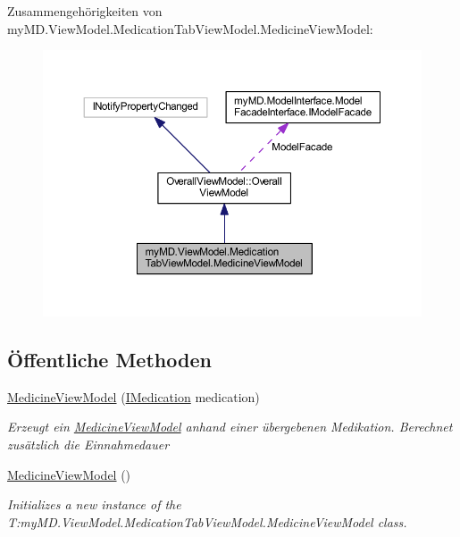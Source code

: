 Zusammengehörigkeiten von my\+M\+D.\+View\+Model.\+Medication\+Tab\+View\+Model.\+Medicine\+View\+Model\+:\nopagebreak
\begin{figure}[H]
\begin{center}
\leavevmode
\includegraphics[width=350pt]{classmy_m_d_1_1_view_model_1_1_medication_tab_view_model_1_1_medicine_view_model__coll__graph}
\end{center}
\end{figure}
\subsection*{Öffentliche Methoden}
\begin{DoxyCompactItemize}
\item 
\mbox{\hyperlink{classmy_m_d_1_1_view_model_1_1_medication_tab_view_model_1_1_medicine_view_model_ae443badf863a9a10f8db6065c7c2268f}{Medicine\+View\+Model}} (\mbox{\hyperlink{interfacemy_m_d_1_1_model_interface_1_1_data_model_interface_1_1_i_medication}{I\+Medication}} medication)
\begin{DoxyCompactList}\small\item\em Erzeugt ein \mbox{\hyperlink{classmy_m_d_1_1_view_model_1_1_medication_tab_view_model_1_1_medicine_view_model}{Medicine\+View\+Model}} anhand einer übergebenen Medikation. Berechnet zusätzlich die Einnahmedauer \end{DoxyCompactList}\item 
\mbox{\hyperlink{classmy_m_d_1_1_view_model_1_1_medication_tab_view_model_1_1_medicine_view_model_a31722e22ef4ffb25f9fc2f9629408ed4}{Medicine\+View\+Model}} ()
\begin{DoxyCompactList}\small\item\em Initializes a new instance of the T\+:my\+M\+D.\+View\+Model.\+Medication\+Tab\+View\+Model.\+Medicine\+View\+Model class. \end{DoxyCompactList}\end{DoxyCompactItemize}
